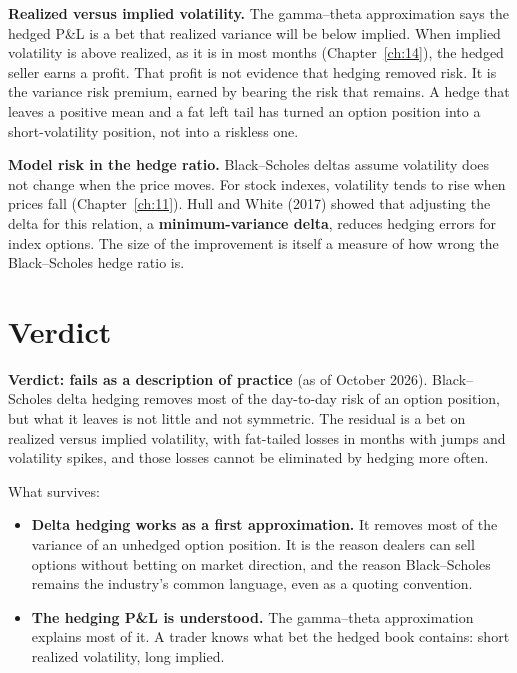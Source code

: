 \textbf{Realized versus implied volatility.} The gamma--theta approximation says the hedged P\&L is a bet that realized variance will be below implied. When implied volatility is above realized, as it is in most months (Chapter~\ref{ch:14}), the hedged seller earns a profit. That profit is not evidence that hedging removed risk. It is the variance risk premium, earned by bearing the risk that remains. A hedge that leaves a positive mean and a fat left tail has turned an option position into a short-volatility position, not into a riskless one.

\textbf{Model risk in the hedge ratio.} Black--Scholes deltas assume volatility does not change when the price moves. For stock indexes, volatility tends to rise when prices fall (Chapter~\ref{ch:11}). Hull and White (2017) showed that adjusting the delta for this relation, a \textbf{minimum-variance delta}, reduces hedging errors for index options. The size of the improvement is itself a measure of how wrong the Black--Scholes hedge ratio is.

\section{Verdict}
\label{sec:15-verdict}

\begin{callout}
\textbf{Verdict: fails as a description of practice} (as of October 2026). Black--Scholes delta hedging removes most of the day-to-day risk of an option position, but what it leaves is not little and not symmetric. The residual is a bet on realized versus implied volatility, with fat-tailed losses in months with jumps and volatility spikes, and those losses cannot be eliminated by hedging more often.
\end{callout}

What survives:

\begin{itemize}
  \item \textbf{Delta hedging works as a first approximation.} It removes most of the variance of an unhedged option position. It is the reason dealers can sell options without betting on market direction, and the reason Black--Scholes remains the industry's common language, even as a quoting convention.
  \item \textbf{The hedging P\&L is understood.} The gamma--theta approximation explains most of it. A trader knows what bet the hedged book contains: short realized volatility, long implied.
\end{itemize}

